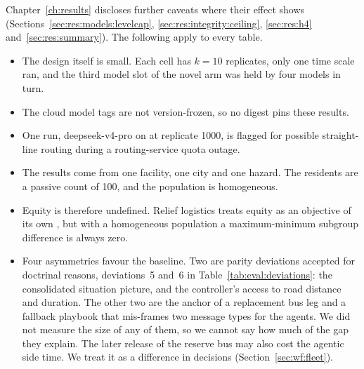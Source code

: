 Chapter~\ref{ch:results} discloses further caveats where their effect shows
(Sections~\ref{sec:res:models:levelcap}, \ref{sec:res:integrity:ceiling},
\ref{sec:res:h4} and~\ref{sec:res:summary}). The following apply to every
table.

\begin{itemize}
\item The design itself is small. Each cell has $k = 10$ replicates, only one
  time scale ran, and the third model slot of the novel arm was held by four
  models in turn.
\item The cloud model tags are not version-frozen, so no digest pins these
  results.
\item One run, deepseek-v4-pro on  at
  replicate 1000, is flagged for possible straight-line routing during a
  routing-service quota outage.
\item The results come from one facility, one city and one hazard. The
  residents are a passive count of 100, and the population is homogeneous.
\item Equity is therefore undefined. Relief logistics treats equity as an
  objective of its own \parencite{huang2012}, but with a homogeneous
  population a maximum-minimum subgroup difference is always zero.
\item Four asymmetries favour the baseline. Two are parity deviations
  accepted for doctrinal reasons, deviations~5 and~6 in
  Table~\ref{tab:eval:deviations}: the consolidated situation picture, and the
  controller's access to road distance and duration. The other two are the
  anchor of a replacement bus leg and a fallback playbook that mis-frames two
  message types for the agents. We did not measure the size of any of them,
  so we cannot say how much of the gap they explain. The later
  release of the reserve bus may also cost the agentic side time. We treat it
  as a difference in decisions (Section~\ref{sec:wf:fleet}).
\end{itemize}
